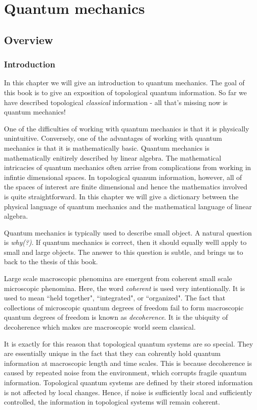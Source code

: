 \documentclass{article}
\theoremstyle{definition}
\numberwithin{figure}{section}
\begin{document}
\section{Quantum mechanics}

\subsection{Overview}

\subsubsection{Introduction}

In this chapter we will give an introduction to quantum mechanics. The goal of this book is to give an exposition of topological quantum information. So far we have described topological \textit{classical} information - all that's missing now is quantum mechanics!

One of the difficulties of working with quantum mechanics is that it is physically unintuitive. Conversely, one of the advantages of working with quantum mechanics is that it is mathematically basic. Quantum mechanics is mathematically enitirely described by linear algebra. The mathematical intricacies of quantum mechanics often arrise from complications from working in infintie dimensional spaces. In topological quanum information, however, all of the spaces of interest are finite dimensional and hence the mathematics involved is quite straightforward. In this chapter we will give a dictionary between the physical language of quantum mechanics and the mathematical language of linear algebra.

Quantum mechanics is typically used to describe small object. A natural question is \textit{why(?)}. If quantum mechanics is correct, then it should equally welll apply to small and large objects. The answer to this question is subtle, and brings us to back to the thesis of this book.

Large scale macroscopic phenomina are emergent from coherent small scale microscopic phenomina. Here, the word \textit{coherent} is used very intentionally. It is used to mean ``held together", ``integrated", or ``organized". The fact that collections of microscopic quantum degrees of freedom fail to form macroscopic quantum degrees of freedom is known as \textit{decoherence}. It is the ubiquity of decoherence which makes are macroscopic world seem classical.

It is exactly for this reason that topological quantum systems are so special. They are essentially unique in the fact that they can cohrently hold quantum information at macroscopic length and time scales. This is because decoherence is caused by repeated noise from the environment, which corrupts fragile quantum information. Topological quantum systems are defined by their stored information is not affected by local changes. Hence, if noise is sufficiently local and sufficiently controlled, the information in topological systems will remain coherent. 
\end{document}
